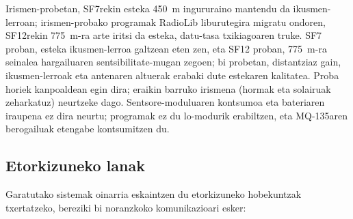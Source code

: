 \documentclass[10pt]{article}
\begin{document}
Irismen-probetan, SF7rekin esteka 450~m ingururaino mantendu da ikusmen-lerroan; irismen-probako programak RadioLib liburutegira migratu ondoren, SF12rekin 775~m-ra arte iritsi da esteka, datu-tasa txikiagoaren truke. SF7 proban, esteka ikusmen-lerroa galtzean eten zen, eta SF12 proban, 775~m-ra seinalea hargailuaren sentsibilitate-mugan zegoen; bi probetan, distantziaz gain, ikusmen-lerroak eta antenaren altuerak erabaki dute estekaren kalitatea. Proba horiek kanpoaldean egin dira; eraikin barruko irismena (hormak eta solairuak zeharkatuz) neurtzeke dago. Sentsore-moduluaren kontsumoa eta bateriaren iraupena ez dira neurtu; programak ez du lo-modurik erabiltzen, eta MQ-135aren berogailuak etengabe kontsumitzen du.\\

\subsection*{Etorkizuneko lanak}

Garatutako sistemak oinarria eskaintzen du etorkizuneko hobekuntzak txertatzeko, bereziki bi noranzkoko komunikazioari esker:\\
\end{document}
